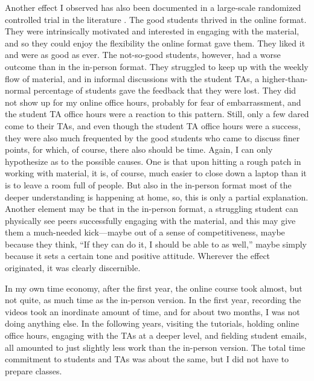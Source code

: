 \documentclass[10pt]{article}
\begin{document}
Another effect I observed has also been documented in a large-scale randomized controlled trial in the literature \citep{cacault2021distance}. The good students thrived in the online format. They were intrinsically motivated and interested in engaging with the material, and so they could enjoy the flexibility the online format gave them. They liked it and were as good as ever. The not-so-good students, however, had a worse outcome than in the in-person format. They struggled to keep up with the weekly flow of material, and in informal discussions with the student TAs, a higher-than-normal percentage of students gave the feedback that they were lost. They did not show up for my online office hours, probably for fear of embarrassment, and the student TA office hours were a reaction to this pattern. Still, only a few dared come to their TAs, and even though the student TA office hours were a success, they were also much frequented by the good students who came to discuss finer points, for which, of course, there also should be time. Again, I can only hypothesize as to the possible causes. One is that upon hitting a rough patch in working with material, it is, of course,  much easier to close down a laptop than it is to leave a room full of people. But also in the in-person format most of the deeper understanding is happening at home, so, this is only a partial explanation. Another element may be that in the in-person format, a struggling student can physically see peers successfully engaging with the material, and this may give them a much-needed kick---maybe out of a sense of competitiveness, maybe because they think, “If they can do it, I should be able to as well,” maybe simply because it sets a certain tone and positive attitude. Wherever the effect originated, it was clearly discernible.

In my own time economy, after the first year, the online course took almost, but not quite, as much time as the in-person version. In the first year, recording the videos took an inordinate amount of time, and for about two months, I was not doing anything else. In the following years, visiting the tutorials, holding online office hours, engaging with the TAs at a deeper level, and fielding student emails, all amounted to just slightly less work than the in-person version. The total time commitment to students and TAs was about the same, but I did not have to prepare classes.
\end{document}
